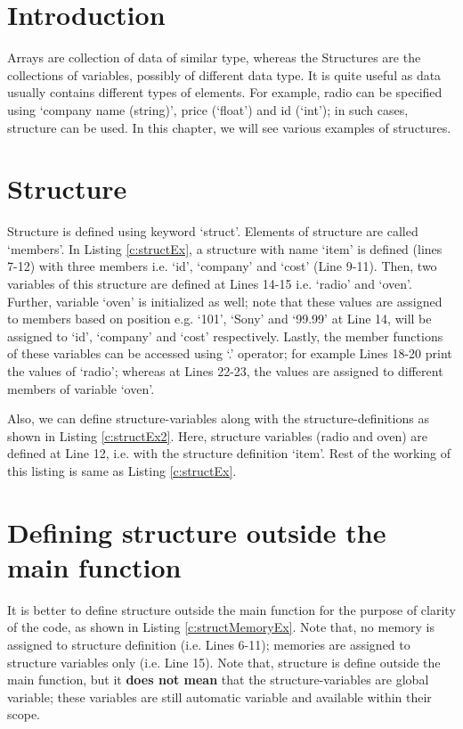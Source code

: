 \section{Introduction}
Arrays are collection of data of similar type, whereas the Structures are the collections of variables, possibly of different data type. It is quite useful as data usually contains different types of elements. For example, radio can be specified using `company name (string)', price (`float') and id (`int'); in such cases, structure can be used. In this chapter, we will see various examples of structures.  


\section{Structure}
Structure is defined using keyword `struct'. Elements of structure are called `members'. In Listing \ref{c:structEx}, a structure with name `item' is defined (lines 7-12) with three members i.e. `id', `company' and `cost' (Line 9-11). Then, two variables of this structure are defined at Lines 14-15 i.e. `radio' and `oven'. Further, variable `oven' is initialized as well; note that these values are assigned to members based on position e.g. `101', `Sony' and `99.99' at Line 14, will be assigned to `id', `company' and `cost' respectively. Lastly, the member functions of these variables can be accessed using `.' operator; for example Lines 18-20 print the values of `radio'; whereas at Lines 22-23, the values are assigned to different members of variable `oven'. 





Also, we can define structure-variables along with the structure-definitions as shown in Listing \ref{c:structEx2}. Here, structure variables (radio and oven) are defined at Line 12, i.e. with the structure definition `item'. Rest of the working of this listing is same as Listing \ref{c:structEx}.



\section{Defining structure outside the main function}
It is better to define structure outside the main function for the purpose of clarity of the code, as shown in Listing \ref{c:structMemoryEx}. Note that, no memory is assigned to structure definition (i.e. Lines 6-11); memories are assigned to structure variables only (i.e. Line 15). Note that, structure is define outside the main function, but it \textbf{does not mean} that the structure-variables are global variable; these variables are still automatic variable and available within their scope. 

